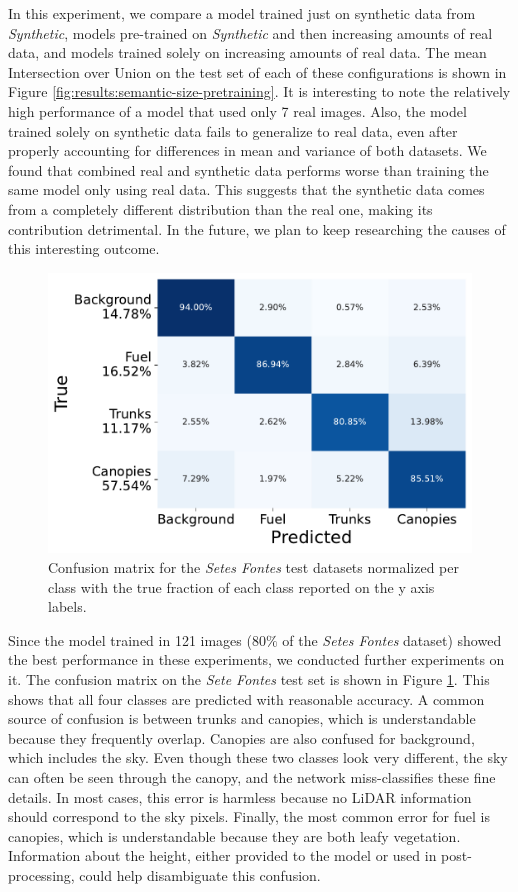 In this experiment, we compare a model trained just on synthetic data from \textit{Synthetic}, models pre-trained on \textit{Synthetic} and then increasing amounts of real data, and models trained solely on increasing amounts of real data. The mean Intersection over Union on the test set of each of these configurations is shown in Figure \ref{fig:results:semantic-size-pretraining}.
It is interesting to note the relatively high performance of a model that used only 7 real images. Also, the model trained solely on synthetic data fails to generalize to real data, even after properly accounting for differences in mean and variance of both datasets. We found that combined real and synthetic data performs worse than training the same model only using real data. This suggests that the synthetic data comes from a completely different distribution than the real one, making its contribution detrimental. In the future, we plan to keep researching the causes of this interesting outcome.
\begin{figure}[H]
    \centering
    \includegraphics[width=0.6\columnwidth]{figs/results/semantic_segmentation/confusion_matrix.pdf} 
    \caption{Confusion matrix for the \textit{Setes Fontes} test datasets normalized per class with the true fraction of each class reported on the y axis labels.
    }
    \label{fig:results:sete_fontes_confusion_matrix}
\end{figure}

Since the model trained in 121 images ($80\%$ of the \textit{Setes Fontes} dataset) showed the best performance in these experiments, we conducted further experiments on it. The confusion matrix on the \textit{Sete Fontes} test set is shown in Figure \ref{fig:results:sete_fontes_confusion_matrix}. This shows that all four classes are predicted with reasonable accuracy. A common source of confusion is between trunks and canopies, which is understandable because they frequently overlap. Canopies are also confused for background, which includes the sky. Even though these two classes look very different, the sky can often be seen through the canopy, and the network miss-classifies these fine details. In most cases, this error is harmless because no LiDAR information should correspond to the sky pixels. Finally, the most common error for fuel is canopies, which is understandable because they are both leafy vegetation. Information about the height, either provided to the model or used in post-processing, could help disambiguate this confusion. 

